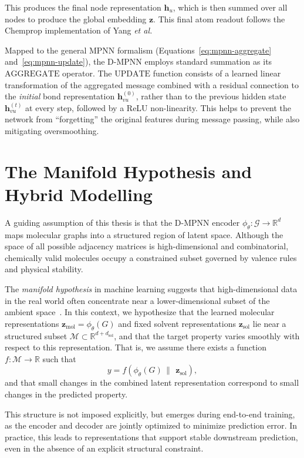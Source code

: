 This produces the final node representation $\mathbf{h}_u$, which is then summed over all nodes to produce the global embedding $\mathbf{z}$. This final atom readout follows the Chemprop implementation of Yang \textit{et al.}

Mapped to the general MPNN formalism (Equations~\ref{eq:mpnn-aggregate} and~\ref{eq:mpnn-update}), the D-MPNN employs standard summation as its $\text{AGGREGATE}$ operator. The $\text{UPDATE}$ function consists of a learned linear transformation of the aggregated message combined with a residual connection to the \emph{initial} bond representation $\mathbf{h}_{vu}^{(0)}$, rather than to the previous hidden state $\mathbf{h}_{vu}^{(t)}$ at every step, followed by a ReLU non-linearity. This helps to prevent the network from ``forgetting'' the original features during message passing, while also mitigating oversmoothing.

\section{The Manifold Hypothesis and Hybrid Modelling}
\label{sec:manifold}

A guiding assumption of this thesis is that the D-MPNN encoder 
$\phi_\theta : \mathcal{G} \to \mathbb{R}^d$ 
maps molecular graphs into a structured region of latent space. 
Although the space of all possible adjacency matrices is high-dimensional and combinatorial, chemically valid molecules occupy a constrained subset governed by valence rules and physical stability.

The \emph{manifold hypothesis} in machine learning suggests that high-dimensional data in the real world often concentrate near a lower-dimensional subset of the ambient space~\cite{cayton2005algorithms, goodfellow2016deep}. In this context, we hypothesize that the learned molecular representations $\mathbf z_\mathrm{mol} = \phi_\theta(G)$ 
and fixed solvent representations $\mathbf z_\mathrm{sol}$ lie near a structured subset $\mathcal{M} \subset \mathbb{R}^{d+d_{\mathrm{sol}}}$, and that the target property varies smoothly with respect to this representation. That is, we assume there exists a function 
$f : \mathcal{M} \to \mathbb{R}$ 
such that
\[
y = f(\phi_\theta(G) \,\|\, \ \mathbf z_\mathrm{sol}),
\]
and that small changes in the combined latent representation correspond to small changes in the predicted property.

This structure is not imposed explicitly, but emerges during end-to-end training, as the encoder and decoder are jointly optimized to minimize prediction error. In practice, this leads to representations that support stable downstream prediction, even in the absence of an explicit structural constraint.

